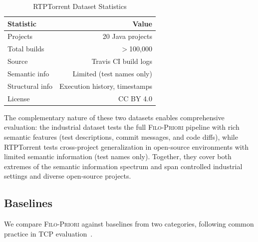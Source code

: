 \documentclass[10pt,journal,compsoc]{IEEEtran}
\newcommand{\filopriori}{\textsc{Filo-Priori}}
\begin{document}
\begin{table}[!t]
\centering
\caption{RTPTorrent Dataset Statistics}
\label{tab:dataset_rtptorrent}
\begin{tabular}{lr}
\toprule
\textbf{Statistic} & \textbf{Value} \\
\midrule
Projects & 20 Java projects \\
Total builds & $>$100,000 \\
Source & Travis CI build logs \\
Semantic info & Limited (test names only) \\
Structural info & Execution history, timestamps \\
License & CC BY 4.0 \\
\bottomrule
\end{tabular}
\end{table}

The complementary nature of these two datasets enables comprehensive evaluation:
the industrial dataset tests the full \filopriori{} pipeline with rich semantic
features (test descriptions, commit messages, and code diffs), while RTPTorrent
tests cross-project generalization in open-source environments with limited
semantic information (test names only). Together, they cover both extremes of
the semantic information spectrum and span controlled industrial settings and
diverse open-source projects.

\subsection{Baselines}

We compare \filopriori{} against baselines from two categories, following common
practice in TCP evaluation~\cite{elbaum2002test, chen2023deeporder}.
\end{document}
